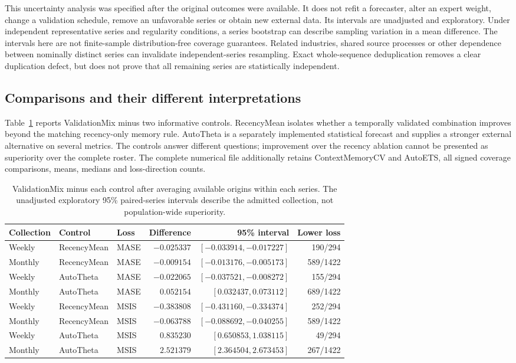 This uncertainty analysis was specified after the original outcomes were
available. It does not refit a forecaster, alter an expert weight, change a
validation schedule, remove an unfavorable series or obtain new external
data. Its intervals are unadjusted and exploratory. Under independent
representative series and regularity conditions, a series bootstrap can
describe sampling variation in a mean difference. The intervals here are not
finite-sample distribution-free coverage guarantees. Related industries,
shared source processes or other dependence between nominally distinct series
can invalidate independent-series resampling. Exact whole-sequence
deduplication removes a clear duplication defect, but does not prove that all
remaining series are statistically independent.

\subsection{Comparisons and their different interpretations}
\label{sec:paired-outcomes}

Table~\ref{tab:paired-main} reports ValidationMix minus two informative controls.
RecencyMean isolates whether a temporally validated combination improves beyond
the matching recency-only memory rule. AutoTheta is a separately implemented
statistical forecast and supplies a stronger external alternative on several
metrics. The controls answer different questions; improvement over the
recency ablation cannot be presented as superiority over the complete roster.
The complete numerical file additionally retains ContextMemoryCV and AutoETS,
all signed coverage comparisons, means, medians and loss-direction counts.

\begin{table}[htbp]\centering\small
\caption{ValidationMix minus each control after averaging available origins
within each series. The unadjusted exploratory 95\% paired-series intervals
describe the admitted collection, not population-wide superiority.}
\label{tab:paired-main}
\begin{tabular}{lllrrr}\toprule
Collection & Control & Loss & Difference & 95\% interval & Lower loss\\\midrule
Weekly & RecencyMean & MASE & $-0.025337$ & $[-0.033914,-0.017227]$ & 190/294\\
Monthly & RecencyMean & MASE & $-0.009154$ & $[-0.013176,-0.005173]$ & 589/1422\\
Weekly & AutoTheta & MASE & $-0.022065$ & $[-0.037521,-0.008272]$ & 155/294\\
Monthly & AutoTheta & MASE & $0.052154$ & $[0.032437,0.073112]$ & 689/1422\\
Weekly & RecencyMean & MSIS & $-0.383808$ & $[-0.431160,-0.334374]$ & 252/294\\
Monthly & RecencyMean & MSIS & $-0.063788$ & $[-0.088692,-0.040255]$ & 589/1422\\
Weekly & AutoTheta & MSIS & $0.835230$ & $[0.650853,1.038115]$ & 49/294\\
Monthly & AutoTheta & MSIS & $2.521379$ & $[2.364504,2.673453]$ & 267/1422\\\bottomrule
\end{tabular}\end{table}


